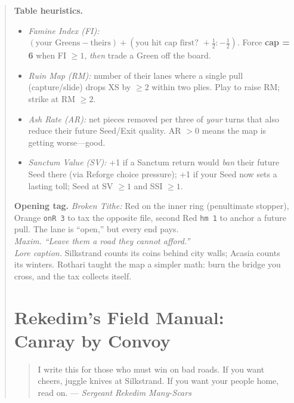 \documentclass[11pt]{article}
\begin{document}
\begin{quote}
\noindent\textbf{Table heuristics.}
\begin{itemize}\itemsep0.2em
  \item \emph{Famine Index (FI):} $(\text{your Greens} - \text{theirs}) + (\text{you hit cap first? }+\tfrac12:-\tfrac12)$. Force \textbf{cap = 6} when FI $\ge 1$, \emph{then} trade a Green off the board.
  \item \emph{Ruin Map (RM):} number of their lanes where a single pull (capture/slide) drops XS by $\ge 2$ within two plies. Play to raise RM; strike at RM $\ge 2$.
  \item \emph{Ash Rate (AR):} net pieces removed per three of \emph{your} turns that also reduce their future Seed/Exit quality. AR $> 0$ means the map is getting worse—good.
  \item \emph{Sanctum Value (SV):} +1 if a Sanctum return would \emph{ban} their future Seed there (via Reforge choice pressure); +1 if your Seed now sets a lasting toll; Seed at SV $\ge 1$ and SSI $\ge 1$.
\end{itemize}

\noindent\textbf{Opening tag.} \emph{Broken Tithe:} Red on the inner ring (penultimate stopper), Orange \texttt{onR 3} to tax the opposite file, second Red \texttt{hm 1} to anchor a future pull. The lane is “open,” but every end pays.\\

\noindent\emph{Maxim.} \textit{“Leave them a road they cannot afford.”}\\

\noindent\textit{Lore caption.} Silkstrand counts its coins behind city walls; Acasia counts its winters. Rothari taught the map a simpler math: burn the bridge you cross, and the tax collects itself.
\clearpage


\section{Rekedim’s Field Manual: Canray by Convoy}
\label{sec:rekedim-manual}

\begin{quote}\small
I write this for those who must win on bad roads. If you want cheers, juggle knives at Silkstrand. If you want your people home, read on. — \textit{Sergeant Rekedim Many-Scars}
\end{quote}


\end{quote}
\end{document}
